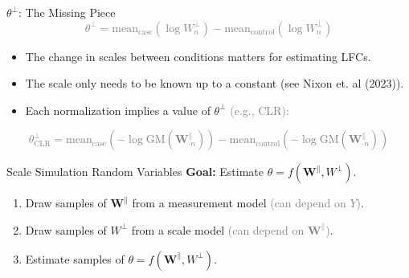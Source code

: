 \documentclass[
  ignorenonframetext,
]{beamer}
\providecommand{\tightlist}{%
  \setlength{\itemsep}{0pt}\setlength{\parskip}{0pt}}
\begin{document}
\begin{frame}{\(\theta^\perp\): The Missing Piece}
\protect\hypertarget{thetaperp-the-missing-piece}{}
\textcolor{gray}{\begin{equation*}
\theta^\perp = \text{mean}_{\text{case}}(\log W_{n}^\perp) - \text{mean}_{\text{control}}(\log W_{n}^\perp)
\end{equation*}}

\vspace{.1in}
\pause

\begin{itemize}
\item
  The change in scales between conditions matters for estimating LFCs.
\item
  The scale only needs to be known up to a constant (see Nixon et. al
  (2023)).
\end{itemize}

\pause

\begin{itemize}
\tightlist
\item
  Each normalization implies a value of \(\theta^\perp\)
  \textcolor{gray}{(e.g., CLR):}
\end{itemize}

\textcolor{gray}{\begin{equation*}
\theta^\perp_{\text{CLR}} = \text{mean}_{\text{case}}(- \log \text{GM}( \mathbf{W}_{\cdot n}^\parallel)) - \text{mean}_{\text{control}}(- \log \text{GM}( \mathbf{W}_{\cdot n}^\parallel)) 
\end{equation*}}
\end{frame}

\begin{frame}{Scale Simulation Random Variables}
\protect\hypertarget{scale-simulation-random-variables}{}
\textbf{Goal:} Estimate \(\theta = f(\mathbf{W}^\parallel, W^\perp)\).

\vspace{.1in}

\begin{enumerate}
\item
  Draw samples of \(\mathbf{W}^{\parallel}\) from a measurement model
  \textcolor{gray}{(can depend on $Y$)}.
\item
  Draw samples of \(W^{\perp}\) from a scale model
  \textcolor{gray}{(can depend on $\mathbf{W}^\parallel$)}.
\item
  Estimate samples of \(\theta = f(\mathbf{W}^\parallel, W^\perp)\).
\end{enumerate}
\end{frame}
\end{document}
